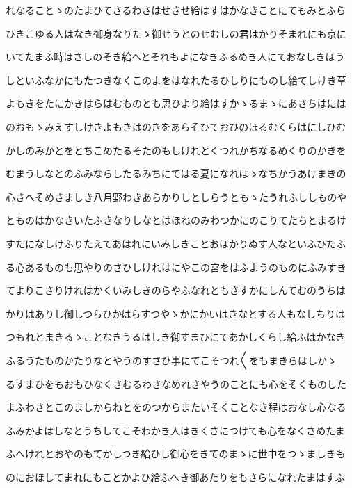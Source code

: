 \documentclass[a4paper,11pt,landscape]{ltjtarticle}
\begin{document}
れなることゝのたまひてさるわさはせさせ給はすはかなきことにてもみとふら
\par\medskip
ひきこゆる人はなき御身なりたゝ御せうとのせむしの君はかりそまれにも京に
\par\medskip
いてたまふ時はさしのそき給へとそれもよになきふるめき人にておなしきほう
\par\medskip
しといふなかにもたつきなくこのよをはなれたるひしりにものし給てしけき草
\par\medskip
よもきをたにかきはらはむものとも思ひより給はすかゝるまゝにあさちはには
\par\medskip
のおもゝみえすしけきよもきはのきをあらそひておひのほるむくらはにしひむ
\par\medskip
かしのみかとをとちこめたるそたのもしけれとくつれかちなるめくりのかきを
\par\medskip
むまうしなとのふみならしたるみちにてはる夏になれはゝなちかうあけまきの
\par\medskip
心さへそめさましき八月野わきあらかりしとしらうともゝたうれふししものや
\par\medskip
とものはかなきいたふきなりしなとはほねのみわつかにのこりてたちとまるけ
\par\medskip
すたになしけふりたえてあはれにいみしきことおほかりぬす人なといふひたふ
\par\medskip
る心あるものも思やりのさひしけれはにやこの宮をはふようのものにふみすき
\par\medskip
てよりこさりけれはかくいみしきのらやふなれともさすかにしんてむのうちは
\par\medskip
かりはありし御しつらひかはらすつやゝかにかいはきなとする人もなしちりは
\par\medskip
つもれとまきるゝことなきうるはしき御すまひにてあかしくらし給ふはかなき
\par\medskip
ふるうたものかたりなとやうのすさひ事にてこそつれ〱をもまきらはしかゝ
\par\medskip
るすまひをもおもひなくさむるわさなめれさやうのことにも心をそくものした
\par\medskip
まふわさとこのましからねとをのつからまたいそくことなき程はおなし心なる
\par\medskip
ふみかよはしなとうちしてこそわかき人はきくさにつけても心をなくさめたま
\par\medskip
ふへけれとおやのもてかしつき給ひし御心をきてのまゝに世中をつゝましきも
\par\medskip
のにおほしてまれにもことかよひ給ふへき御あたりをもさらになれたまはすふ
\par\medskip
\end{document}
